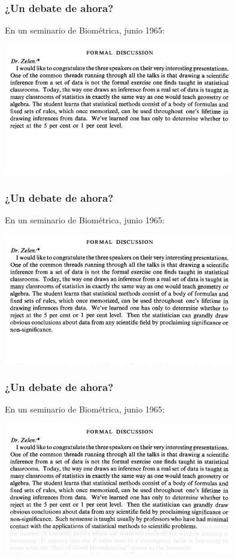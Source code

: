 \documentclass[9pt]{beamer}
\begin{document}
\begin{frame}
  \frametitle{¿Un debate de ahora?}
  \begin{overlayarea}{\textwidth}{\textheight}
  En un seminario de Biométrica, junio 1965:
  \begin{center}
    \includegraphics[width=10cm]{images/cutler_3}
  \end{center}
\end{overlayarea}
\end{frame}
\begin{frame}
  \frametitle{¿Un debate de ahora?}
    \begin{overlayarea}{\textwidth}{\textheight}
  En un seminario de Biométrica, junio 1965:
  \begin{center}
    \includegraphics[width=10cm]{images/cutler_4}
  \end{center}
\end{overlayarea}
\end{frame}
\begin{frame}
  \frametitle{¿Un debate de ahora?}
    \begin{overlayarea}{\textwidth}{\textheight}
  En un seminario de Biométrica, junio 1965:
  \begin{center}
    \includegraphics[width=10cm]{images/cutler_5}
  \end{center}
\end{overlayarea}
\end{frame}
\end{document}
